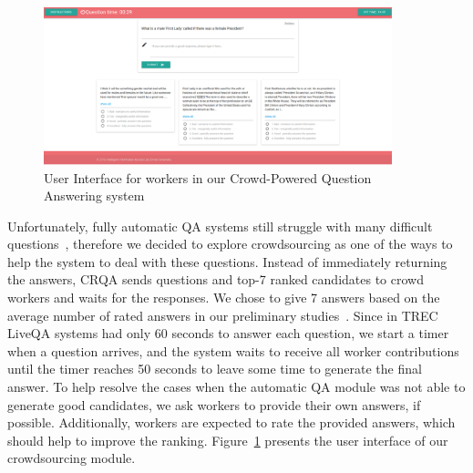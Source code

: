 \documentclass[letterpaper]{article}
\begin{document}
\begin{figure}[h!t]
	\centering
	\includegraphics[width=0.9\textwidth]{img/crowd_ui}
	\caption{User Interface for workers in our Crowd-Powered Question Answering system}
	\label{fig:crowd_ui}
\end{figure}

Unfortunately, fully automatic QA systems still struggle with many difficult questions~\cite{overviewliveqa15}, therefore we decided to explore crowdsourcing as one of the ways to help the system to deal with these questions.
Instead of immediately returning the answers, CRQA sends questions and top-7 ranked candidates to crowd workers and waits for the responses.
We chose to give 7 answers based on the average number of rated answers in our preliminary studies~\cite{savenkov_crowdsourcing2016a}.
Since in TREC LiveQA systems had only 60 seconds to answer each question, we start a timer when a question arrives, and the system waits to receive all worker contributions until the timer reaches 50 seconds to leave some time to generate the final answer.
To help resolve the cases when the automatic QA module was not able to generate good candidates, we ask workers to provide their own answers, if possible.
Additionally, workers are expected to rate the provided answers, which should help to improve the ranking.
Figure~\ref{fig:crowd_ui} presents the user interface of our crowdsourcing module.
\end{document}
